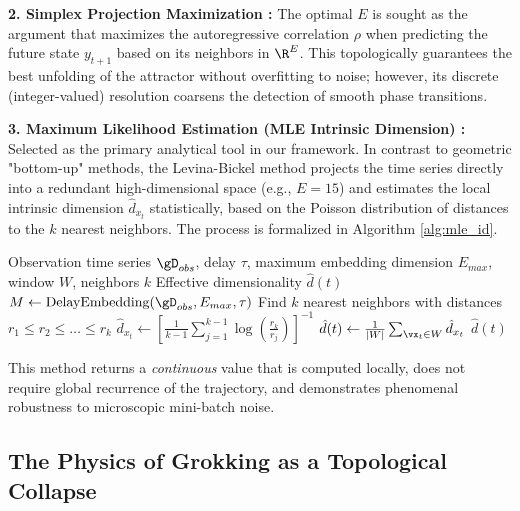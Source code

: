\documentclass{article}
\begin{document}
\textbf{2. Simplex Projection Maximization \cite{sugihara1990nonlinear}:}
The optimal $E$ is sought as the argument that maximizes the autoregressive correlation $\rho$ when predicting the future state $y_{t+1}$ based on its neighbors in $\R^E$. This topologically guarantees the best unfolding of the attractor without overfitting to noise; however, its discrete (integer-valued) resolution coarsens the detection of smooth phase transitions.

\textbf{3. Maximum Likelihood Estimation (MLE Intrinsic Dimension) \cite{levina2004maximum}:}
Selected as the primary analytical tool in our framework. In contrast to geometric "bottom-up" methods, the Levina-Bickel method projects the time series directly into a redundant high-dimensional space (e.g., $E=15$) and estimates the local intrinsic dimension $\hat{d}_{x_t}$ statistically, based on the Poisson distribution of distances to the $k$ nearest neighbors. The process is formalized in Algorithm \ref{alg:mle_id}.

\begin{algorithm}[htbp]
\caption{MLE Intrinsic Dimension Estimation (Levina-Bickel)}\label{alg:mle_id}
\begin{algorithmic}[1]
\Input Observation time series $\gD_{obs}$, delay $\tau$, maximum embedding dimension $E_{max}$, window $W$, neighbors $k$
\Output Effective dimensionality $\hat{d}(t)$
\State $M \gets \text{DelayEmbedding}(\gD_{obs}, E_{max}, \tau)$ 
    \State Find $k$ nearest neighbors with distances $r_1 \le r_2 \le \dots \le r_k$
    \State $\hat{d}_{x_t} \gets \left[ \frac{1}{k-1} \sum_{j=1}^{k-1} \log \left( \frac{r_k}{r_j} \right) \right]^{-1}$ 
\EndFor
\State $\hat{d}(t) \gets \frac{1}{|W|} \sum_{\vx_t \in W} \hat{d}_{x_t}$ 
\State \Return $\hat{d}(t)$
\end{algorithmic}
\end{algorithm}

This method returns a \textit{continuous} value that is computed locally, does not require global recurrence of the trajectory, and demonstrates phenomenal robustness to microscopic mini-batch noise.

\subsection{The Physics of Grokking as a Topological Collapse}\label{sec:theory_grokking}
\end{document}
